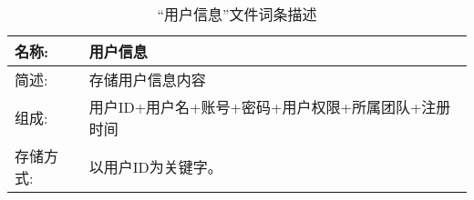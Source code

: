 \begin{table}[H]  
\caption{“用户信息”文件词条描述}  
\begin{center}  
    \begin{tabular}{l p{10cm}} 
        \hline
        \quad 名称:  &   用户信息 \\
        \hline
        \quad 简述:  & 存储用户信息内容\\
        \hline
        \quad 组成:  & 用户ID+用户名+账号+密码+用户权限+所属团队+注册时间 \\
        \hline
        \quad 存储方式:  & 以用户ID为关键字。 \\
        \hline
    \end{tabular}
    \label{tab1}
\end{center}
\end{table}
